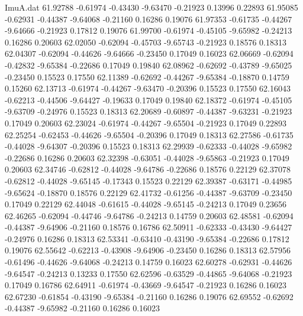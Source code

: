 \begin{filecontents}{ImuA.dat}
  61.92788   -0.61974   -0.43430   -9.63470   -0.21923    0.13996    0.22893
  61.95085   -0.62931   -0.44387   -9.64068   -0.21160    0.16286    0.19076
  61.97353   -0.61735   -0.44267   -9.64666   -0.21923    0.17812    0.19076
  61.99700   -0.61974   -0.45105   -9.65982   -0.24213    0.16286    0.20603
  62.02050   -0.62094   -0.45703   -9.65743   -0.21923    0.18576    0.18313
  62.04307   -0.62094   -0.44626   -9.64666   -0.23450    0.17049    0.16023
  62.06669   -0.62094   -0.42832   -9.65384   -0.22686    0.17049    0.19840
  62.08962   -0.62692   -0.43789   -9.65025   -0.23450    0.15523    0.17550
  62.11389   -0.62692   -0.44267   -9.65384   -0.18870    0.14759    0.15260
  62.13713   -0.61974   -0.44267   -9.63470   -0.20396    0.15523    0.17550
  62.16043   -0.62213   -0.44506   -9.64427   -0.19633    0.17049    0.19840
  62.18372   -0.61974   -0.45105   -9.63709   -0.24976    0.15523    0.18313
  62.20689   -0.60897   -0.44387   -9.63231   -0.21923    0.17049    0.20603
  62.23024   -0.61974   -0.44267   -9.65504   -0.21923    0.17049    0.22893
  62.25254   -0.62453   -0.44626   -9.65504   -0.20396    0.17049    0.18313
  62.27586   -0.61735   -0.44028   -9.64307   -0.20396    0.15523    0.18313
  62.29939   -0.62333   -0.44028   -9.65982   -0.22686    0.16286    0.20603
  62.32398   -0.63051   -0.44028   -9.65863   -0.21923    0.17049    0.20603
  62.34746   -0.62812   -0.44028   -9.64786   -0.22686    0.18576    0.22129
  62.37078   -0.62812   -0.44028   -9.65145   -0.17343    0.15523    0.22129
  62.39387   -0.63171   -0.44985   -9.65624   -0.18870    0.18576    0.22129
  62.41732   -0.61256   -0.44387   -9.63709   -0.23450    0.17049    0.22129
  62.44048   -0.61615   -0.44028   -9.65145   -0.24213    0.17049    0.23656
  62.46265   -0.62094   -0.44746   -9.64786   -0.24213    0.14759    0.20603
  62.48581   -0.62094   -0.44387   -9.64906   -0.21160    0.18576    0.16786
  62.50911   -0.62333   -0.43430   -9.64427   -0.24976    0.16286    0.18313
  62.53341   -0.63410   -0.43190   -9.65384   -0.22686    0.17812    0.19076
  62.55642   -0.62213   -0.43908   -9.64906   -0.23450    0.16286    0.18313
  62.57956   -0.61496   -0.44626   -9.64068   -0.24213    0.14759    0.16023
  62.60278   -0.62931   -0.44626   -9.64547   -0.24213    0.13233    0.17550
  62.62596   -0.63529   -0.44865   -9.64068   -0.21923    0.17049    0.16786
  62.64911   -0.61974   -0.43669   -9.64547   -0.21923    0.16286    0.16023
  62.67230   -0.61854   -0.43190   -9.65384   -0.21160    0.16286    0.19076
  62.69552   -0.62692   -0.44387   -9.65982   -0.21160    0.16286    0.16023

\end{filecontents}
